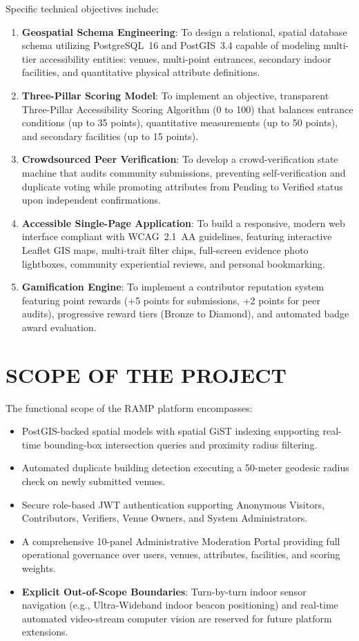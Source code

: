 \documentclass[12pt,a4paper]{report}
\begin{document}
Specific technical objectives include:
\begin{enumerate}
    \item \textbf{Geospatial Schema Engineering}: To design a relational, spatial database schema utilizing PostgreSQL~16 and PostGIS~3.4 capable of modeling multi-tier accessibility entities: venues, multi-point entrances, secondary indoor facilities, and quantitative physical attribute definitions.
    \item \textbf{Three-Pillar Scoring Model}: To implement an objective, transparent Three-Pillar Accessibility Scoring Algorithm (0 to 100) that balances entrance conditions (up to 35 points), quantitative measurements (up to 50 points), and secondary facilities (up to 15 points).
    \item \textbf{Crowdsourced Peer Verification}: To develop a crowd-verification state machine that audits community submissions, preventing self-verification and duplicate voting while promoting attributes from Pending to Verified status upon independent confirmations.
    \item \textbf{Accessible Single-Page Application}: To build a responsive, modern web interface compliant with WCAG~2.1~AA guidelines, featuring interactive Leaflet GIS maps, multi-trait filter chips, full-screen evidence photo lightboxes, community experiential reviews, and personal bookmarking.
    \item \textbf{Gamification Engine}: To implement a contributor reputation system featuring point rewards (+5 points for submissions, +2 points for peer audits), progressive reward tiers (Bronze to Diamond), and automated badge award evaluation.
\end{enumerate}

\section{SCOPE OF THE PROJECT}
The functional scope of the RAMP platform encompasses:
\begin{itemize}
    \item PostGIS-backed spatial models with spatial GiST indexing supporting real-time bounding-box intersection queries and proximity radius filtering.
    \item Automated duplicate building detection executing a 50-meter geodesic radius check on newly submitted venues.
    \item Secure role-based JWT authentication supporting Anonymous Visitors, Contributors, Verifiers, Venue Owners, and System Administrators.
    \item A comprehensive 10-panel Administrative Moderation Portal providing full operational governance over users, venues, attributes, facilities, and scoring weights.
    \item \textbf{Explicit Out-of-Scope Boundaries}: Turn-by-turn indoor sensor navigation (e.g., Ultra-Wideband indoor beacon positioning) and real-time automated video-stream computer vision are reserved for future platform extensions.
\end{itemize}
\end{document}
